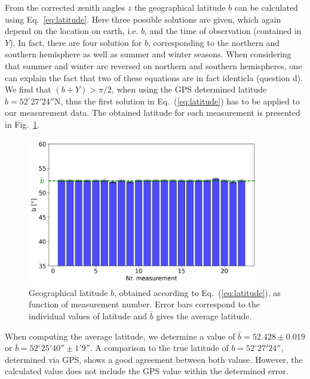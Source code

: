 \label{chap:fazit}

From the corrected zenith angles $z$ the geographical latitude $b$ can be calculated using Eq.~\ref{eq:latitude}. Here three possible solutions are given, which again depend on the location on earth, i.e. $b$, and the time of observation (contained in $Y$). In fact, there are four solution for $b$, corresponding to the northern and southern hemisphere as well as summer and winter seasons. When considering that summer and winter are reversed on northern and southern hemispheres, one can explain the fact that two of these equations are in fact identicla (question d).\\
We find that $(b+Y)>\pi/2$, when using the GPS determined latitude $b=52^\circ 27' 24''$N, thus the first solution in Eq.~(\ref{eq:latitude}) has to be applied to our measurement data. The obtained latitude for each measurement is presented in Fig.~\ref{fig:latitude}.

\begin{figure}[]
    \centering
    \includegraphics[width=0.9\textwidth]{05-Fazit/histogram.png}
    \caption{Geographical latitude $b$, obtained according to Eq.~(\ref{eq:latitude}), as function of measurement number. Error bars correspond to the individual values of latitude and $\bar b$ gives the average latitude.}
    \label{fig:latitude}
\end{figure}

When computing the average latitude, we determine a value of $\bar b =52.428 \pm 0.019$ or $\bar b = 52^\circ 25' 40'' \pm 1' 9''$. A comparison to the true latitude of $b=52^\circ 27' 24''$, determined via GPS, shows a good agreement between both valuse. However, the calculated value does not include the GPS value within the determined error. 


